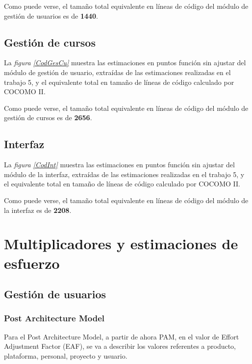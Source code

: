 \documentclass[11pt,a4paper,spanish,twoside]{report}
\begin{document}

Como puede verse, el tamaño total equivalente en líneas de código del módulo
de gestión de usuarios es de \textbf{1440}.

\section{Gestión de cursos}
La \emph{figura \ref{CodGesCu}} muestra las estimaciones en puntos función sin
ajustar del módulo de gestión de usuario, extraídas de las estimaciones
realizadas en el trabajo 5, y el equivalente total en tamaño de líneas de
código calculado por COCOMO II.


Como puede verse, el tamaño total equivalente en líneas de código del módulo
de gestión de cursos es de \textbf{2656}.

\section{Interfaz}
La \emph{figura \ref{CodInt}} muestra las estimaciones en puntos función sin
ajustar del módulo de la interfaz, extraídas de las estimaciones realizadas en
el trabajo 5, y el equivalente total en tamaño de líneas de código calculado
por COCOMO II.


Como puede verse, el tamaño total equivalente en líneas de código del módulo
de la interfaz es de \textbf{2208}.

\chapter{Multiplicadores y estimaciones de esfuerzo}
\section{Gestión de usuarios}
\subsection{Post Architecture Model}
Para el Post Architecture Model, a partir de ahora PAM, en el valor de Effort
Adjustment Factor (EAF), se va a describir los valores referentes a producto,
plataforma, personal, proyecto y usuario. 
\end{document}
